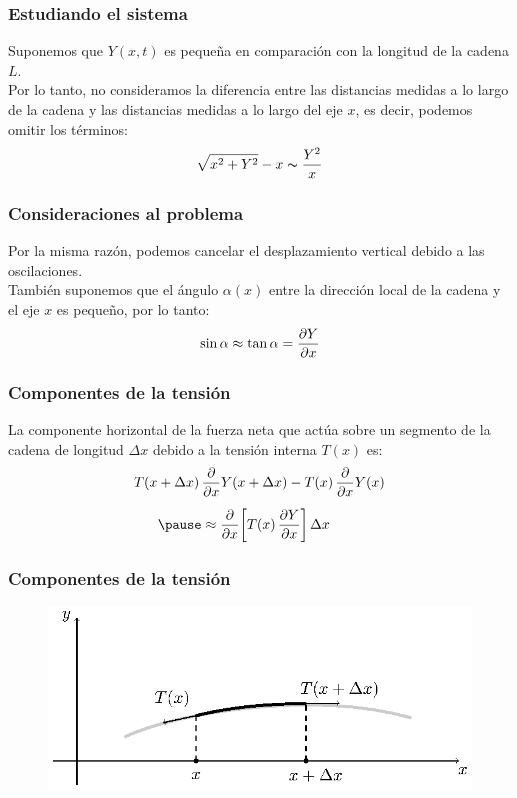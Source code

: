 \documentclass[12pt]{beamer}
\begin{document}
\begin{frame}
\frametitle{Estudiando el sistema}
Suponemos que $Y (x, t)$ es pequeña en comparación con la longitud de la cadena $L$.
\\
\bigskip
\pause
Por lo tanto, no consideramos  la diferencia entre las distancias medidas a lo largo de la cadena y las distancias medidas a lo largo del eje $x$, es decir, podemos omitir los términos:
\pause
\begin{align*}
\sqrt{x^{2} + Y^{2}} - x \thicksim \dfrac{Y^{2}}{x}
\end{align*}
\end{frame}
\begin{frame}
\frametitle{Consideraciones al problema}
Por la misma razón, podemos cancelar el desplazamiento vertical debido a las oscilaciones.
\\
\bigskip
\pause
También suponemos que el ángulo $\alpha (x)$ entre la dirección local de la cadena y el eje $x$ es pequeño, por lo tanto:
\pause
\begin{align}
\sin \alpha \approx \tan \alpha = \pdv{Y}{x}
\label{eq:ecuacion_01}
\end{align}
\end{frame}
\begin{frame}
\frametitle{Componentes de la tensión}
La componente horizontal de la fuerza neta que actúa sobre un segmento de la cadena de longitud $\Delta x$ debido a la tensión interna $T (x)$ es:
\pause
\begin{eqnarray}
\begin{aligned}[b]
T (x  + \Delta x) \, &\pdv{x} Y (x + \Delta x) - T (x) \, \pdv{x} Y (x) \\[0.5em] \pause
&\approx \pdv{x} \bigg[ T (x) \, \pdv{Y}{x}  \bigg] \, \Delta x
\end{aligned}
\label{eq:ecuacion_02}
\end{eqnarray}
\end{frame}
\begin{frame}
\frametitle{Componentes de la tensión}
\begin{figure}[H]
    \centering
    \includegraphics[scale=1.1]{Imagenes/Cadena_Oscilante_02.eps}
    \label{fig:figura_elemento_cadena}
\end{figure}
\end{frame}
\end{document}
